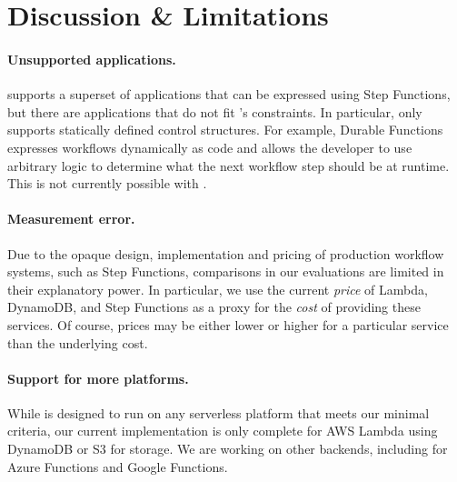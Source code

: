 \section{Discussion \& Limitations}\label{sec:limitations}


\paragraph{Unsupported applications.} \name{} supports a superset of
applications that can be expressed using Step Functions, but there are
applications that do not fit \name{}'s constraints. In particular, \name{} only
supports statically defined control structures. For example, Durable Functions
expresses workflows dynamically as code and allows the developer to use
arbitrary logic to determine what the next workflow step should be at runtime.
This is not currently possible with \name{}.

\paragraph{Measurement error.} Due to the opaque design, implementation and
pricing of production workflow systems, such as Step Functions, comparisons in
our evaluations are limited in their explanatory power. In particular, we use
the current \emph{price} of Lambda, DynamoDB, and Step Functions as a proxy for
the \emph{cost} of providing these services. Of course, prices may be either
lower or higher for a particular service than the underlying cost.

\paragraph{Support for more platforms.} While \name{} is designed
to run on any serverless platform that meets our minimal criteria, our current
implementation is only complete for AWS Lambda using DynamoDB or S3 for storage.
We are working on other backends, including for Azure Functions and Google
Functions.

